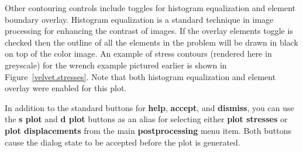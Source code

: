 Other contouring controls include toggles for histogram equalization and
element boundary overlay.  Histogram equalization is a standard technique
in image processing for enhancing the contrast of images.  If the overlay
elements toggle is checked then the outline of all the elements in the problem
will be drawn in black on top of the color image.  An example of stress
contours (rendered here in greyscale) for the wrench example pictured
earlier is shown in Figure~\ref{velvet.stresses}.  Note that both histogram
equalization and element overlay were enabled for this plot.

In addition to the standard buttons for {\bf help}, {\bf accept}, and
{\bf dismiss}, you can use the {\bf s plot} and {\bf d plot} buttons as
an alias for selecting either {\bf plot stresses} or {\bf plot displacements}
from the main {\bf postprocessing} menu item.  Both buttons cause the
dialog state to be accepted before the plot is generated.

